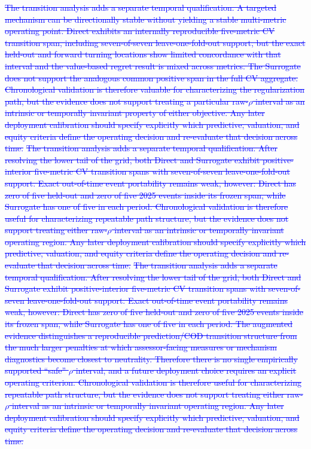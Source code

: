 \documentclass[10pt]{article}
\theoremstyle{definition}
\newcommand{\1}{\mathbf{1}}
\newcommand{\oldtext}[1]{\textcolor{blue}{\sout{#1}}}
\begin{document}
\oldtext{The transition analysis adds a separate temporal qualification. A targeted mechanism can be directionally stable without yielding a stable multi-metric operating point. Direct exhibits an internally reproducible five-metric CV transition span, including seven-of-seven leave-one-fold-out support, but the exact held-out and forward turning locations show limited concordance with that interval and the value-based regret result is mixed across metrics. The Surrogate does not support the analogous common positive span in the full CV aggregate. Chronological validation is therefore valuable for characterizing the regularization path, but the evidence does not support treating a particular raw-$\rho$ interval as an intrinsic or temporally invariant property of either objective. Any later deployment calibration should specify explicitly which predictive, valuation, and equity criteria define the operating decision and re-evaluate that decision across time.}
\oldtext{The transition analysis adds a separate temporal qualification. After resolving the lower tail of the grid, both Direct and Surrogate exhibit positive-interior five-metric CV transition spans with seven-of-seven leave-one-fold-out support. Exact out-of-time event portability remains weak, however: Direct has zero of five held-out and zero of five 2025 events inside its frozen span, while Surrogate has one of five in each period. Chronological validation is therefore useful for characterizing repeatable path structure, but the evidence does not support treating either raw-$\rho$ interval as an intrinsic or temporally invariant operating region. Any later deployment calibration should specify explicitly which predictive, valuation, and equity criteria define the operating decision and re-evaluate that decision across time.}
\oldtext{The transition analysis adds a separate temporal qualification. After resolving the lower tail of the grid, both Direct and Surrogate exhibit positive-interior five-metric CV transition spans with seven-of-seven leave-one-fold-out support. Exact out-of-time event portability remains weak, however: Direct has zero of five held-out and zero of five 2025 events inside its frozen span, while Surrogate has one of five in each period. The augmented evidence distinguishes a reproducible prediction/COD transition structure from the much larger penalties at which assessor-facing measures or mechanism diagnostics become closest to neutrality. Therefore there is no single empirically supported ``safe'' $\rho$ interval, and a future deployment choice requires an explicit operating criterion. Chronological validation is therefore useful for characterizing repeatable path structure, but the evidence does not support treating either raw-$\rho$ interval as an intrinsic or temporally invariant operating region. Any later deployment calibration should specify explicitly which predictive, valuation, and equity criteria define the operating decision and re-evaluate that decision across time.}
\end{document}
